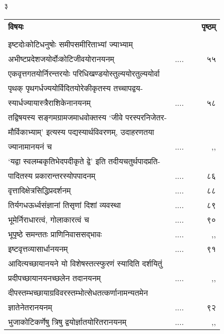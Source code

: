 \documentclass[11pt, openany]{book}
\begin{document}
\newpage
\begin{center}
	३
\end{center}
\vspace{3mm}
\thispagestyle{empty}
\begin{tabular}{lp{2cm}p{.2cm}r}
\hspace{1cm} \textbf{विषयः} &&& \textbf{पृष्ठम्} \\
&&&\\
इष्टदोःकोटिधनुषोः समीपसमीरिताभ्यां ज्याभ्याम् \\अभीष्टप्रदेशजयोर्दोःकोटिजीवयोरानयनम्  & ....&& ~ ५५\\
एकवृत्तगतयोर्निरन्तरयोः परिधिखण्डयोस्तुल्ययोरतुल्ययोर्वा \\
पृथक् पृथगर्धज्ययोर्विदितयोरेकीकृतस्य तच्चापद्वय-\\
स्यार्धज्यायास्त्रैराशिकेनानयनम् & ....&& ~ ५८\\
तद्विषयस्य सङ्गमग्रामजमाधवोक्तस्य `जीवे परस्परनिजेतर-\\
मौर्विकाभ्याम्' इत्यस्य पद्यस्यार्थविवरणम्, उदाहरणतया \\
ज्यानामानयनं च & ....&& ~ ,,\\
`यद्वा स्वलम्बकृतिभेदपदीकृते द्वे' इति तदीयचतुर्थपादप्रति-\\
पादितस्य प्रकारान्तरस्योपपादनम्  & ....&& ~ ८६\\
वृत्तादिक्षेत्रसिद्धिप्रदर्शनम् & ....&& ~ ८८\\
तिर्यगधऊर्ध्वसंज्ञानां तिसृणां दिशां व्यवस्था & ....&& ~ ८९\\
भूमेर्निराधारत्वं, गोलाकारत्वं च & ....&& ~ ९०\\
भूपृष्ठे समन्ततः प्राणिनिवाससद्भावः & ....&&~ ,,\\
इष्टवृत्तव्यासार्धानयनम् & ....&& ~ ९१\\
आदित्यच्छायानयने यो विशेषस्तत्स्फुरणं स्यादिति दर्शयितुं  
\\प्रदीपच्छायानयनच्छलेन तदानयनम्  & ....&& ~ ,, \\
दीपस्तम्भच्छायाग्रविवरस्तम्भोत्सेधतत्कर्णानामन्यतमेन \\ ज्ञातेनेतरानयनम् 
 & ....&&~ ९२\\
भुजाकोटिकर्णेषु त्रिषु द्वयोर्ज्ञातयोरितरानयनम् & ....&&~ ,,\\

\end{tabular}
\end{document}
